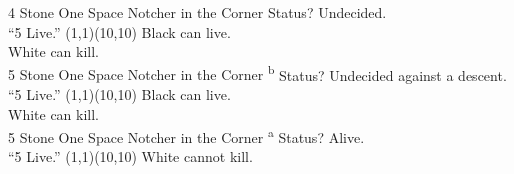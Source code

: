 \documentclass[12pt]{letter}
\begin{document}


\makeflashcardwithboards
  {\Large4 Stone One Space Notcher in the Corner}
  {Status?}
  {Undecided.\\``5 Live.''}
  {(1,1)(10,10)}
  {
       
       
       
  }
  {Black can live.\\\null}
  {  }
  {White can kill.\\\null}
  {   }
\makeflashcardwithboards
  {\Large5 Stone One Space Notcher in the Corner \textsuperscript{b}}
  {Status?}
  {Undecided against a descent.\\``5 Live.''}
  {(1,1)(10,10)}
  {
       
     
       
       
  }
  {Black can live.\\\null}
  {  }
  {White can kill.\\\null}
  {    }
\makeflashcardwithboards
  {\Large5 Stone One Space Notcher in the Corner \textsuperscript{a}}
  {Status?}
  {Alive.\\``5 Live.''}
  {(1,1)(10,10)}
  {
       
     
       
       
  }
  {White cannot kill.\\\null}
  {     }
  {}
  {}
\end{document}
